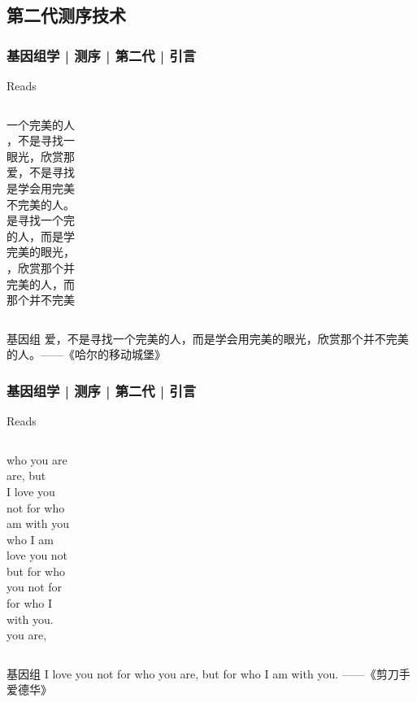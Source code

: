 \subsection{第二代测序技术}
\begin{frame}
  \frametitle{基因组学 | 测序 | 第二代 | 引言}
  \begin{block}{Reads}
    \begin{columns}
一个完美的人 \\ ，不是寻找一 \\ 眼光，欣赏那 \\ 爱，不是寻找 \\ 是学会用完美 \\  不完美的人。 \\
是寻找一个完 \\ 的人，而是学 \\ 完美的眼光， \\ ，欣赏那个并 \\ 完美的人，而 \\ 那个并不完美  \\
    \end{columns}
  \end{block}
  \pause
  \begin{block}{基因组}
    爱，不是寻找一个完美的人，而是学会用完美的眼光，欣赏那个并不完美的人。——《哈尔的移动城堡》
  \end{block}
\end{frame}

\begin{frame}
  \frametitle{基因组学 | 测序 | 第二代 | 引言}
  \begin{block}{Reads}
    \begin{columns}
      who you are \\ are, but \\ I love you \\ not for who \\ am with you \\ who I am \\
      love you not \\ but for who \\ you not for \\ for who I \\ with you. \\ you are, \\
    \end{columns}
  \end{block}
  \pause
  \begin{block}{基因组}
    I love you not for who you are, but for who I am with you. ——《剪刀手爱德华》
  \end{block}
\end{frame}

